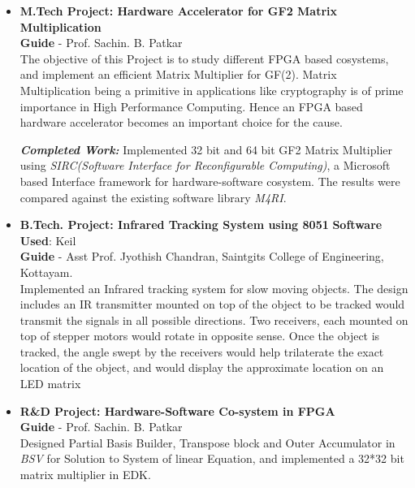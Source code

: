 \documentclass[a4paper,10pt]{article}
\begin{document}
 \begin{itemize}

\setlength{\itemsep}{1pt}
 \item \textbf{M.Tech Project: Hardware Accelerator for GF2 Matrix Multiplication }\\ %
	{\textbf{Guide} - Prof. Sachin. B. Patkar\\}
	The objective of this Project is to study different FPGA based cosystems, and implement an efficient Matrix Multiplier for GF(2).
	Matrix Multiplication being a primitive in applications like cryptography is of prime importance in High Performance Computing. 
	Hence an FPGA based hardware accelerator becomes an important choice for the cause. 
	
 \textbf{\textit{Completed Work:}} 
   Implemented 32 bit and 64 bit GF2 Matrix Multiplier using \textit{SIRC(Software Interface for Reconfigurable Computing)}, a Microsoft based Interface framework
   for hardware-software cosystem. The results were compared against the existing software library \textit{M4RI}. 



  \item \textbf{{B.Tech. Project: Infrared Tracking System using 8051}}  \qquad\qquad\qquad\qquad \textbf{Software Used}: Keil\\
        {\textbf{Guide} - Asst Prof. Jyothish Chandran, Saintgits College of Engineering, Kottayam.\\}                                                   
	Implemented an Infrared tracking system for slow moving objects. The design includes an IR transmitter mounted on top of the 
	object to be tracked would transmit the signals in all possible directions. Two receivers, each mounted on top of stepper motors
	would rotate in opposite sense. Once the object is tracked, the angle swept by the receivers would help trilaterate the exact location of the object, 
	and would display the approximate location on an LED matrix

  \item \textbf{{R\&D Project: Hardware-Software Co-system in FPGA}}\\
	{\textbf{Guide} - Prof. Sachin. B. Patkar \qquad\qquad\qquad\quad\qquad\qquad\qquad\quad\qquad\qquad\qquad\qquad\qquad\qquad\quad \\}
	Designed Partial Basis Builder, Transpose block and Outer Accumulator in \textit{BSV} for Solution to System of linear Equation, and
	implemented a 32*32 bit matrix multiplier in EDK.
	

\end{itemize}
\end{document}
